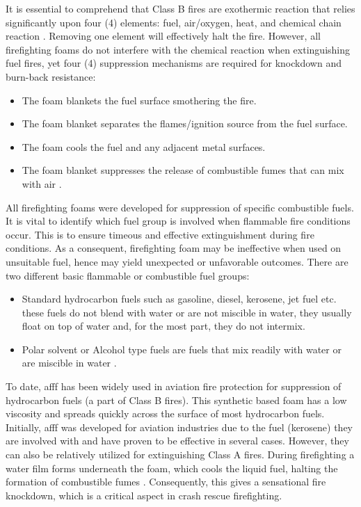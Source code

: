 It is essential to comprehend that Class B fires are exothermic reaction that relies significantly upon four (4) elements: fuel, air/oxygen, heat, and chemical chain reaction \cite{beneventi2001role}. Removing one element will effectively halt the fire.  However, all firefighting foams do not interfere with the chemical reaction when extinguishing fuel fires, yet four (4) suppression mechanisms are required for knockdown and burn-back resistance:

\begin{itemize}
    \item The foam blankets the fuel surface smothering the fire. 
    \item The foam blanket separates the flames/ignition source from the fuel surface. 
    \item The foam cools the fuel and any adjacent metal surfaces. 
    \item The foam blanket suppresses the release of combustible fumes that can mix with air \cite{beneventi2001role}. 
\end{itemize}

All firefighting foams were developed for suppression of specific combustible fuels. It is vital to identify which fuel group is involved when flammable fire conditions occur. This is to ensure timeous and effective extinguishment during fire conditions. As a consequent, firefighting foam may be ineffective when used on unsuitable fuel, hence may yield unexpected or unfavorable outcomes. There are two different basic flammable or combustible fuel groups:

\begin{itemize}
    \item Standard hydrocarbon fuels such as gasoline, diesel, kerosene, jet fuel etc. these fuels do not blend with water or are not miscible in water, they usually float on top of water and, for the most part, they do not intermix.
    \item Polar solvent or Alcohol type fuels are fuels that mix readily with water or are miscible in water \cite{beneventi2001role}.
\end{itemize}

To date, \acrshort{afff} has been widely used in aviation fire protection for suppression of hydrocarbon fuels (a part of Class B fires). This synthetic based foam has a low viscosity and spreads quickly across the surface of most hydrocarbon fuels. Initially, \acrshort{afff} was developed for aviation industries due to the fuel (kerosene) they are involved with and have proven to be effective in several cases. However, they can also be relatively utilized for extinguishing Class A fires. During firefighting a water film forms underneath the foam, which cools the liquid fuel, halting the formation of combustible fumes \cite{scheffey1995evaluating}. Consequently, this gives a sensational fire knockdown, which is a critical aspect in crash rescue firefighting.


